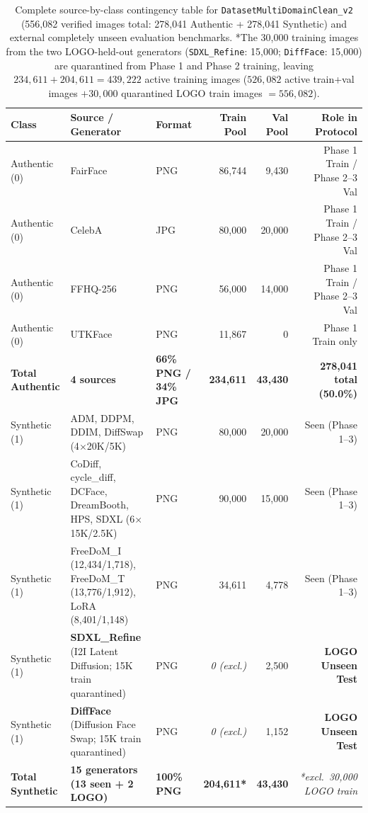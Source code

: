 \documentclass[fleqn,10pt]{wlscirep}
\begin{document}
\begin{table}[tbp]
\centering
\caption{Complete source-by-class contingency table for \texttt{DatasetMultiDomainClean\_v2} (556,082 verified images total: 278,041 Authentic + 278,041 Synthetic) and external completely unseen evaluation benchmarks. *The 30,000 training images from the two LOGO-held-out generators (\texttt{SDXL\_Refine}: 15,000; \texttt{DiffFace}: 15,000) are quarantined from Phase 1 and Phase 2 training, leaving $234,611 + 204,611 = 439,222$ active training images ($526,082$ active train+val images $+ 30,000$ quarantined LOGO train images $= 556,082$).}
\label{tab:contingency}
\small
\begin{tabular}{@{}lllrrr@{}}
\toprule
\textbf{Class} & \textbf{Source / Generator} & \textbf{Format} & \textbf{Train Pool} & \textbf{Val Pool} & \textbf{Role in Protocol} \\
\midrule
Authentic (0) & FairFace \cite{ref46} & PNG & 86,744 & 9,430 & Phase 1 Train / Phase 2--3 Val \\
Authentic (0) & CelebA \cite{ref36} & JPG & 80,000 & 20,000 & Phase 1 Train / Phase 2--3 Val \\
Authentic (0) & FFHQ-256 \cite{ref47} & PNG & 56,000 & 14,000 & Phase 1 Train / Phase 2--3 Val \\
Authentic (0) & UTKFace \cite{ref48} & PNG & 11,867 & 0 & Phase 1 Train only \\
\textbf{Total Authentic} & \textbf{4 sources} & \textbf{66\% PNG / 34\% JPG} & \textbf{234,611} & \textbf{43,430} & \textbf{278,041 total (50.0\%)} \\
\midrule
Synthetic (1) & ADM, DDPM, DDIM, DiffSwap (4$\times$20K/5K) & PNG & 80,000 & 20,000 & Seen (Phase 1--3) \\
Synthetic (1) & CoDiff, cycle\_diff, DCFace, DreamBooth, HPS, SDXL (6$\times$15K/2.5K) & PNG & 90,000 & 15,000 & Seen (Phase 1--3) \\
Synthetic (1) & FreeDoM\_I (12,434/1,718), FreeDoM\_T (13,776/1,912), LoRA (8,401/1,148) & PNG & 34,611 & 4,778 & Seen (Phase 1--3) \\
Synthetic (1) & \textbf{SDXL\_Refine} (I2I Latent Diffusion; 15K train quarantined) & PNG & \textit{0 (excl.)} & 2,500 & \textbf{LOGO Unseen Test} \\
Synthetic (1) & \textbf{DiffFace} \cite{ref21} (Diffusion Face Swap; 15K train quarantined) & PNG & \textit{0 (excl.)} & 1,152 & \textbf{LOGO Unseen Test} \\
\textbf{Total Synthetic} & \textbf{15 generators (13 seen + 2 LOGO)} & \textbf{100\% PNG} & \textbf{204,611*} & \textbf{43,430} & \textit{*excl.\ 30,000 LOGO train} \\

\end{tabular}
\end{table}
\end{document}

